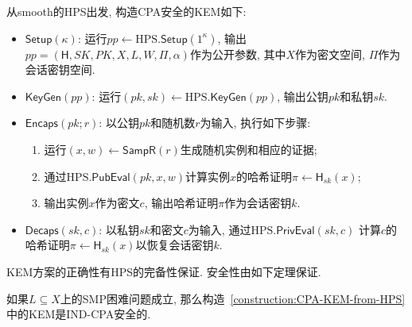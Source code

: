 \begin{construction}[基于HPS的CPA安全KEM]\label{construction:CPA-KEM-from-HPS}
从smooth的HPS出发, 构造CPA安全的KEM如下: 
\begin{itemize}
\item $\mathsf{Setup}(\kappa)$: 运行$pp \leftarrow \text{HPS}.\mathsf{Setup}(1^\kappa)$, 
    输出$pp = (\mathsf{H}, SK, PK, X, L, W, \Pi, \alpha)$作为公开参数, 其中$X$作为密文空间, $\Pi$作为会话密钥空间. 

\item $\mathsf{KeyGen}(pp)$: 运行$(pk, sk) \leftarrow \text{HPS}.\mathsf{KeyGen}(pp)$, 输出公钥$pk$和私钥$sk$. 

\item $\mathsf{Encaps}(pk; r)$: 以公钥$pk$和随机数$r$为输入, 执行如下步骤: 
\begin{enumerate}
    \item 运行$(x, w) \leftarrow \mathsf{SampR}(r)$生成随机实例和相应的证据;
    \item 通过$\text{HPS}.\mathsf{PubEval}(pk, x, w)$计算实例$x$的哈希证明$\pi \leftarrow \mathsf{H}_{sk}(x)$; 
    \item 输出实例$x$作为密文$c$, 输出哈希证明$\pi$作为会话密钥$k$. 
\end{enumerate}

\item $\mathsf{Decaps}(sk, c)$: 以私钥$sk$和密文$c$为输入, 通过$\text{HPS}.\mathsf{PrivEval}(sk, c)$
    计算$c$的哈希证明$\pi \leftarrow \mathsf{H}_{sk}(x)$以恢复会话密钥$k$. 
\end{itemize}
\end{construction} 

KEM方案的正确性有HPS的完备性保证. 安全性由如下定理保证. 

\begin{theorem}
如果$L \subseteq X$上的SMP困难问题成立, 那么构造~\ref{construction:CPA-KEM-from-HPS}中的KEM是IND-CPA安全的. 
\end{theorem}

